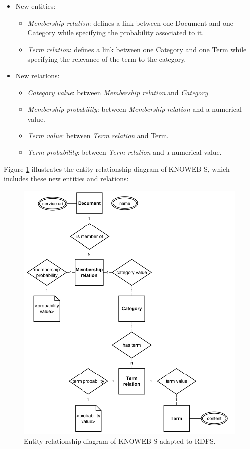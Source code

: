 \begin{itemize}

\item New entities: 
\begin{itemize}
\item \emph{Membership relation}: defines a link between one Document and one Category while specifying the probability associated to it. 
\item \emph{Term relation}: defines a link between one Category and one Term while specifying the relevance of the term to the category.
\end{itemize}

\item New relations: 
\begin{itemize}
\item \emph{Category value}: between \emph{Membership relation} and \emph{Category} 
\item \emph{Membership probability}: between \emph{Membership relation} and a numerical value. 
\item \emph{Term value}: between \emph{Term relation} and Term. 
\item \emph{Term probability}: between \emph{Term relation} and a numerical
value.
\end{itemize}
\end{itemize}

Figure \ref{KNOWEBS-data-model-RDF} illustrates the entity-relationship diagram of KNOWEB-S, which includes these new entities and relations:

\begin{figure}
\center\includegraphics[scale=0.48]{images/KNOWEB-S-RDF-en}

\caption{Entity-relationship diagram of KNOWEB-S adapted to RDFS.}
\label{KNOWEBS-data-model-RDF}
\end{figure}


